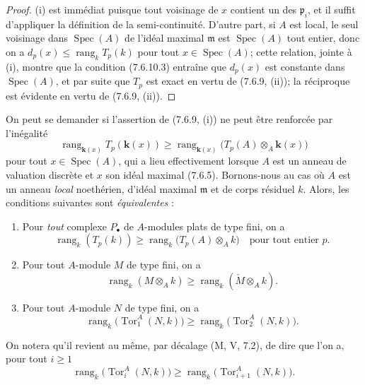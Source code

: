 \begin{proof}
(i) est immédiat puisque tout voisinage de $x$ contient un des $\mathfrak p_i$,
et il suffit d'appliquer la définition de la semi-continuité. D'autre part, si
$A$ est local, le seul voisinage dans $\operatorname{Spec}(A)$ de l'idéal
maximal $\mathfrak m$ est $\operatorname{Spec}(A)$ tout entier, donc on a
$d_p(x)\leq\operatorname{rang}_k T_p(k)$
pour tout $x\in\operatorname{Spec}(A)$; cette relation, jointe à (i), montre que
la condition (7.6.10.3) entraîne que $d_p(x)$ est constante dans
$\operatorname{Spec}(A)$, et par suite que $T_p$ est exact en vertu de
(7.6.9, (ii)); la réciproque est évidente en vertu de (7.6.9, (ii)).
\end{proof}

\begin{remark}[7.6.11]
On peut se demander si l'assertion de (7.6.9, (i)) ne peut être renforcée par
l'inégalité
\[
  \operatorname{rang}_{\mathbf{k}(x)}T_p(\boldsymbol{k}(x))
  \geq
  \operatorname{rang}_{\mathbf{k}(x)}
    \bigl(T_p(A)\otimes_A\boldsymbol{k}(x)\bigr)
  \tag{7.6.11.1}\label{III.7.6.11.1.fr}
\]
pour tout $x\in\operatorname{Spec}(A)$, qui a lieu effectivement lorsque $A$
est un anneau de valuation discrète et $x$ son idéal maximal (7.6.5).
Bornons-nous au cas où $A$ est un anneau \emph{local} noethérien, d'idéal maximal
$\mathfrak m$ et de corps résiduel $k$. Alors, les conditions suivantes sont
\emph{équivalentes} :
\begin{enumerate}
  \item[\emph{a)}] Pour \emph{tout} complexe $P_\bullet$ de $A$-modules plats de type fini,
    on a
    \[
      \operatorname{rang}_k(T_p(k))
      \geq
      \operatorname{rang}_k\bigl(T_p(A)\otimes_A k\bigr)
      \quad\text{pour tout entier }p.
      \tag{7.6.11.2}\label{III.7.6.11.2.fr}
    \]
  \item[\emph{b)}] Pour tout $A$-module $M$ de type fini, on a
    \[
      \operatorname{rang}_k(M\otimes_A k)
      \geq
      \operatorname{rang}_k(\check M\otimes_A k).
      \tag{7.6.11.3}\label{III.7.6.11.3.fr}
    \]
  \item[\emph{c)}] Pour tout $A$-module $N$ de type fini, on a
    \[
      \operatorname{rang}_k\bigl(\operatorname{Tor}_1^A(N,k)\bigr)
      \geq
      \operatorname{rang}_k\bigl(\operatorname{Tor}_2^A(N,k)\bigr).
      \tag{7.6.11.4}\label{III.7.6.11.4.fr}
    \]
\end{enumerate}

On notera qu'il revient au même, par décalage (M, V, 7.2), de dire que l'on a,
pour tout $i\geq1$
\[
  \operatorname{rang}_k\bigl(\operatorname{Tor}_i^A(N,k)\bigr)
  \geq
  \operatorname{rang}_k\bigl(\operatorname{Tor}_{i+1}^A(N,k)\bigr).
  \tag{7.6.11.5}\label{III.7.6.11.5.fr}
\]


\end{remark}
